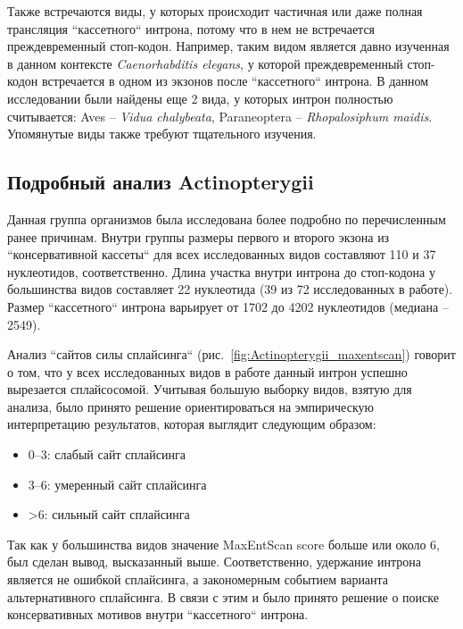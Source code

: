 Также встречаются виды, у которых происходит частичная или даже полная трансляция ``кассетного`` интрона, потому что в нем не встречается преждевременный стоп-кодон.
Например, таким видом является давно изученная в данном контексте \textit{Caenorhabditis elegans}, у которой преждевременный стоп-кодон встречается в одном из экзонов после ``кассетного`` интрона.
В данном исследовании были найдены еще 2 вида, у которых интрон полностью считывается: Aves – \textit{Vidua chalybeata}, Paraneoptera – \textit{Rhopalosiphum maidis}.
Упомянутые виды также требуют тщательного изучения.


\subsection{Подробный анализ Actinopterygii}

Данная группа организмов была исследована более подробно по перечисленным ранее причинам.
Внутри группы размеры первого и второго экзона из ``консервативной кассеты`` для всех исследованных видов составляют 110 и 37 нуклеотидов, соответственно.
Длина участка внутри интрона до стоп-кодона у большинства видов составляет 22 нуклеотида (39 из 72 исследованных в работе).
Размер ``кассетного`` интрона варьирует от 1702 до 4202 нуклеотидов (медиана – 2549).

Анализ ``сайтов силы сплайсинга`` (рис.~\ref{fig:Actinopterygii_maxentscan}) говорит о том, что у всех исследованных видов в работе данный интрон успешно вырезается сплайсосомой.
Учитывая большую выборку видов, взятую для анализа, было принято решение ориентироваться на эмпирическую интерпретацию результатов, которая выглядит следующим образом:

\begin{spacing}{0.5}
\begin{itemize}
    \item 0–3: слабый сайт сплайсинга
    \item 3–6: умеренный сайт сплайсинга
    \item >6: сильный сайт сплайсинга
\end{itemize}
\end{spacing}

Так как у большинства видов значение MaxEntScan score больше или около 6, был сделан вывод, высказанный выше.
Соответственно, удержание интрона является не ошибкой сплайсинга, а закономерным событием варианта альтернативного сплайсинга.
В связи с этим и было принято решение о поиске консервативных мотивов внутри ``кассетного`` интрона.

